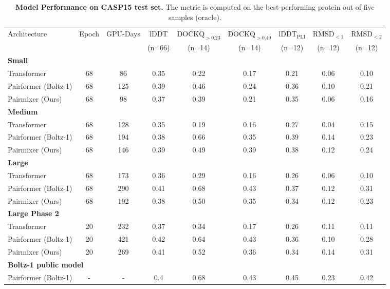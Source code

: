 \documentclass{article} %
\newcommand{\lbltbl}[1]{\label{tbl:#1}}
\begin{document}
\begin{table}[t]
\centering
\caption{
\textbf{Model Performance on CASP15 test set. }
The metric is computed on the best-performing protein out of five samples (oracle).
}
\tiny
\begin{tabular}{lcccccccc}
\toprule
Architecture & Epoch & GPU-Days & lDDT & $\text{DOCKQ}_{>0.23}$ & $\text{DOCKQ}_{>0.49}$ & $\text{lDDT}_\text{PLI}$ & $\text{RMSD}_{<1}$ & $\text{RMSD}_{<2}$ \\
 & & & (n=66) & (n=14) & (n=14) & (n=12) & (n=12) & (n=12) \\
\midrule
\multicolumn{9}{l}{\textbf{Small }} \\
Transformer & 68 & 86 & 0.35 & 0.22 & 0.17 & 0.21 & 0.06 & 0.10 \\
Pairformer (Boltz-1) & 68 & 125 & 0.39 & 0.46 & 0.24 & 0.36 & 0.10 & 0.21 \\
Pairmixer (Ours) & 68 & 98 & 0.37 & 0.39 & 0.21 & 0.35 & 0.06 & 0.16 \\
\midrule
\multicolumn{9}{l}{\textbf{Medium }} \\
Transformer & 68 & 128 & 0.35 & 0.19 & 0.16 & 0.27 & 0.04 & 0.15 \\
Pairformer (Boltz-1) & 68 & 194 & 0.38 & 0.66 & 0.35 & 0.39 & 0.14 & 0.23 \\
Pairmixer (Ours) & 68 & 146 & 0.39 & 0.49 & 0.39 & 0.38 & 0.12 & 0.24 \\
\midrule
\multicolumn{9}{l}{\textbf{Large }} \\
Transformer & 68 & 173 & 0.36 & 0.29 & 0.16 & 0.26 & 0.06 & 0.10 \\
Pairformer (Boltz-1) & 68 & 290 & 0.41 & 0.68 & 0.43 & 0.37 & 0.12 & 0.31 \\
Pairmixer (Ours) & 68 & 192 & 0.38 & 0.50 & 0.35 & 0.34 & 0.12 & 0.23 \\
\midrule
\multicolumn{9}{l}{\textbf{Large Phase 2}} \\
Transformer & 20 & 232 & 0.37 & 0.34 & 0.17 & 0.26 & 0.11 & 0.11 \\
Pairformer (Boltz-1) & 20 & 421 & 0.42 & 0.64 & 0.43 & 0.36 & 0.10 & 0.28 \\
Pairmixer (Ours) & 20 & 269 & 0.41 & 0.52 & 0.36 & 0.34 & 0.14 & 0.31 \\
\midrule
\multicolumn{9}{l}{\textbf{Boltz-1 public model}} \\
Pairformer (Boltz-1) & - & - & 0.4 & 0.68 & 0.43 & 0.45 & 0.23 & 0.42 \\
\bottomrule
\end{tabular}
\lbltbl{full_results_casp15}
\end{table}
\end{document}
